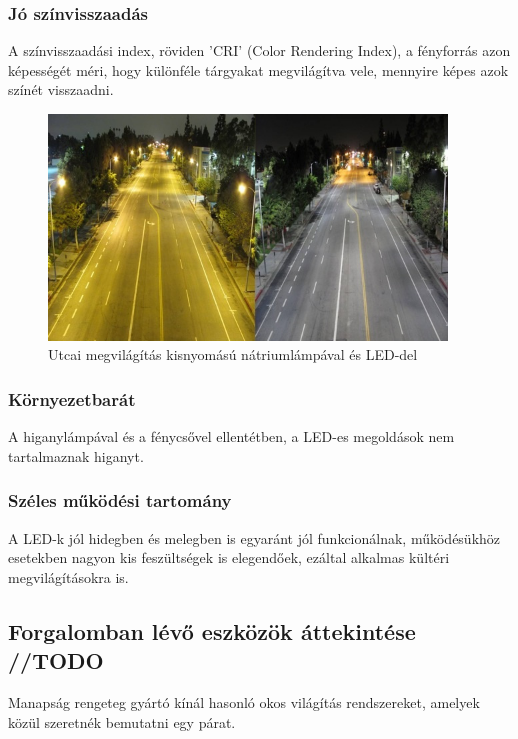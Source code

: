 \documentclass[../main.tex]{subfiles}
\begin{document}
        \subsubsection{Jó színvisszaadás}
            A színvisszaadási index, röviden 'CRI' (Color Rendering Index), a fényforrás azon képességét méri, hogy különféle tárgyakat megvilágítva vele, mennyire képes azok színét visszaadni. %
             \begin{figure}[h!] %
                \centering
                \includegraphics[height=6cm]{irodalom_res/cri_los_angeles.jpg}
                \caption{Utcai megvilágítás kisnyomású nátriumlámpával és LED-del} %
             \end{figure}
             
        \subsubsection{Környezetbarát}
            A higanylámpával és a fénycsővel ellentétben, a LED-es megoldások nem tartalmaznak higanyt.
        \subsubsection{Széles működési tartomány}
            A LED-k jól hidegben és melegben is egyaránt jól funkcionálnak, működésükhöz esetekben nagyon kis feszültségek is elegendőek, ezáltal alkalmas kültéri megvilágításokra is.
    
    \subsection{Forgalomban lévő eszközök áttekintése //TODO}
        Manapság rengeteg gyártó kínál hasonló okos világítás rendszereket, amelyek közül szeretnék bemutatni egy párat.\\
                            
\end{document}
